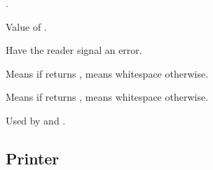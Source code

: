 \begin{LIST}{1cm}
  {
  \index{\#\#}%
  .
  }

  {
  Value of .
  }

  \IT{\KWD{\#\boldmath$<$}}
  {
  Have the reader signal an error.
  }

  {
  Means  if  returns \T, means whitespace
  otherwise. 
  }

  {
  Means  if  returns \NIL, means whitespace
  otherwise. 
  }

  {
  Used by \kwd{\#+} and \kwd{\#--}.
  }

\end{LIST}


\subsection{Printer} 


